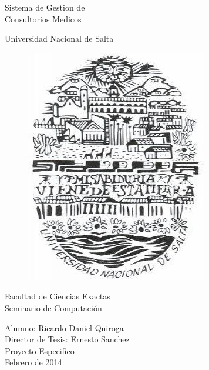
%


\begin{titlepage}


\begin{center}
    {\fontsize{45}{45} \selectfont 
    Sistema de Gestion de \\ Consultorios Medicos \\[2.3cm] }
\end{center}


\begin{center}
    \LARGE Universidad Nacional de Salta \\
    \begin{figure}[h]
        \begin{center}
        \includegraphics[scale=0.5]{resourse/logo-UNSa.jpg}
        \end{center}
    \end{figure}

    
    \LARGE Facultad de Ciencias Exactas \\
    Seminario de Computaci\'on \\ [2.3cm]
\end{center}


\begin{flushright}
    \Large Alumno: Ricardo Daniel Quiroga \\
    Director de Tesis: Ernesto Sanchez \\
    Proyecto Especifico \\ 
    Febrero de 2014 
    
    
\end{flushright}



\end{titlepage}


